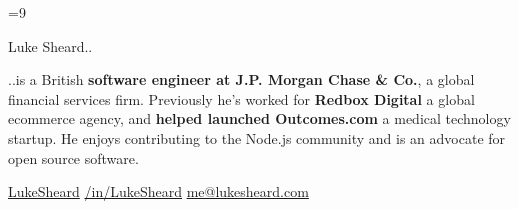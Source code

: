 \documentclass{article}
\begin{document}
\color{body}

=9\relax     %

\raggedright

\fontsize{10pt}{13pt}\selectfont


\begin{minipage}[t]{\textwidth}
  {\Huge
    Luke Sheard..
  }

  {\vspace{10pt}
    ..is a British \textbf{software engineer at J.P. Morgan Chase \& Co.}, a global financial services firm. 
    Previously he's worked for \textbf{Redbox Digital} a global ecommerce agency, 
    and \textbf{helped launched Outcomes.com} a medical technology startup.
    He enjoys contributing to the Node.js community and is an advocate for open source software. 
  }

  \vspace{5pt}

  \faGithub
  \hspace{3pt}
  \href{https://www.github.com/LukeSheard}{LukeSheard}
  \hspace{20pt}
  \faLinkedin
  \hspace{3pt}
  \href{http://www.linkedin.com/in/lukesheard}{/in/LukeSheard}
  \hspace{20pt}
  \faEnvelope
  \hspace{3pt}
  \href{mailto:me@lukesheard.com}{me@lukesheard.com}

  \vspace{20pt}
\end{minipage}
\end{document}
